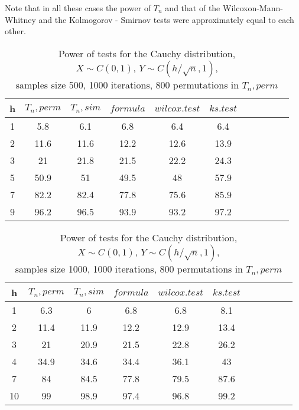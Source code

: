 \documentclass[final,11pt,3p]{elsarticle}
\begin{document}
Note that in all these cases the power of  $T_n$ and  that of the Wilcoxon-Mann-Whitney and the
Kolmogorov - Smirnov tests were approximately equal to each other.



\begin{longtable}{|c|c|c|c|c|c|c|c|c|c|c|}
  \caption{Power of tests for the Cauchy distribution, \\
           $X\sim C(0,1)$, $Y\sim C(h/\sqrt{n},1)$, \\
           samples size 500, 1000 iterations, 800 permutations in $T_n, perm$} \\
  \hline
  h & $T_n, perm$ & $T_n, sim$ & $formula$ & $wilcox.test$ & $ks.test$ \\ \hline
  1 & 5.8   & 6.1      & 6.8       & 6.4           & 6.4       \\
  2 & 11.6  & 11.6     & 12.2      & 12.6          & 13.9      \\
  3 & 21    & 21.8     & 21.5      & 22.2          & 24.3      \\
  5 & 50.9  & 51       & 49.5      & 48            & 57.9      \\
  7 & 82.2  & 82.4     & 77.8      & 75.6          & 85.9      \\
  9 & 96.2  & 96.5     & 93.9      & 93.2          & 97.2      \\ \hline
\end{longtable}

\begin{longtable}{|c|c|c|c|c|c|c|c|c|c|c|}
  \caption{Power of tests for the Cauchy distribution, \\
           $X\sim C(0,1)$, $Y\sim C(h/\sqrt{n},1)$, \\
           samples size 1000, 1000 iterations, 800 permutations in $T_n, perm$} \\
  \hline
  h  & $T_n, perm$ & $T_n, sim$ & $formula$ & $wilcox.test$ & $ks.test$ \\ \hline
  1  & 6.3   & 6        & 6.8       & 6.8           & 8.1       \\
  2  & 11.4  & 11.9     & 12.2      & 12.9          & 13.4      \\
  3  & 21    & 20.9     & 21.5      & 22.8          & 26.2      \\
  4  & 34.9  & 34.6     & 34.4      & 36.1          & 43        \\
  7  & 84    & 84.5     & 77.8      & 79.5          & 87.6      \\
  10 & 99    & 98.9     & 97.4      & 96.8          & 99.2      \\ \hline
\end{longtable}
\end{document}
